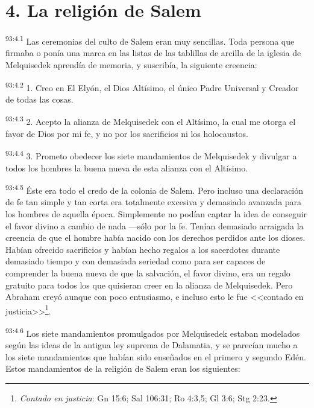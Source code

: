 \section*{4. La religión de Salem}
\par
\textsuperscript{93:4.1} Las ceremonias del culto de Salem eran muy sencillas. Toda persona que firmaba o ponía una marca en las listas de las tablillas de arcilla de la iglesia de Melquisedek aprendía de memoria, y suscribía, la siguiente creencia:

\par
\textsuperscript{93:4.2} 1. Creo en El Elyón, el Dios Altísimo, el único Padre Universal y Creador de todas las cosas.

\par
\textsuperscript{93:4.3} 2. Acepto la alianza de Melquisedek con el Altísimo, la cual me otorga el favor de Dios por mi fe, y no por los sacrificios ni los holocaustos.

\par
\textsuperscript{93:4.4} 3. Prometo obedecer los siete mandamientos de Melquisedek y divulgar a todos los hombres la buena nueva de esta alianza con el Altísimo.

\par
\textsuperscript{93:4.5} Éste era todo el credo de la colonia de Salem. Pero incluso una declaración de fe tan simple y tan corta era totalmente excesiva y demasiado avanzada para los hombres de aquella época. Simplemente no podían captar la idea de conseguir el favor divino a cambio de nada ---sólo por la fe. Tenían demasiado arraigada la creencia de que el hombre había nacido con los derechos perdidos ante los dioses. Habían ofrecido sacrificios y habían hecho regalos a los sacerdotes durante demasiado tiempo y con demasiada seriedad como para ser capaces de comprender la buena nueva de que la salvación, el favor divino, era un regalo gratuito para todos los que quisieran creer en la alianza de Melquisedek. Pero Abraham creyó aunque con poco entusiasmo, e incluso esto le fue <<contado en justicia>>\footnote{\textit{Contado en justicia}: Gn 15:6; Sal 106:31; Ro 4:3,5; Gl 3:6; Stg 2:23.}.

\par
\textsuperscript{93:4.6} Los siete mandamientos promulgados por Melquisedek estaban modelados según las ideas de la antigua ley suprema de Dalamatia, y se parecían mucho a los siete mandamientos que habían sido enseñados en el primero y segundo Edén. Estos mandamientos de la religión de Salem eran los siguientes:

